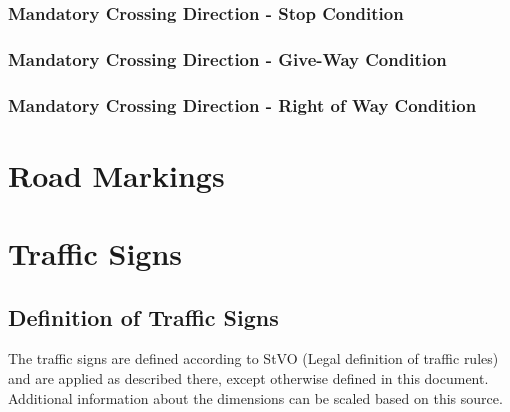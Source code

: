\subsubsection{Mandatory Crossing Direction - Stop Condition}
\begin{figure}[H]
	\begin{center}
		\centering
	\end{center}
\end{figure}

\subsubsection{Mandatory Crossing Direction - Give-Way Condition}
\begin{figure}[H]
	\begin{center}
		\centering
	\end{center}
\end{figure}

\subsubsection{Mandatory Crossing Direction - Right of Way Condition}
\begin{figure}[H]
	\begin{center}
		\centering
	\end{center}
\end{figure}

\section{Road Markings}
\label{fig_road_markings}
\begin{figure}[H]
	\begin{center}
		\centering
	\end{center}
\end{figure}

\section{Traffic Signs}
\label{fig_traffic_signs}
\subsection{Definition of Traffic Signs}
The traffic signs are defined according to StVO (Legal definition of traffic
rules) and are applied as described there, except otherwise defined in this
document. Additional information about the dimensions can be scaled based on
this source.

